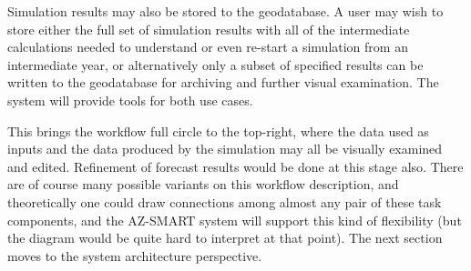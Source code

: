 Simulation results may also be stored to the geodatabase.  A user
may wish to store either the full set of simulation results with all
of the intermediate calculations needed to understand or even
re-start a simulation from an intermediate year, or alternatively
only a subset of specified results can be written to the geodatabase
for archiving and further visual examination.  The system will
provide tools for both use cases.

This brings the workflow full circle to the top-right, where the
data used as inputs and the data produced by the simulation may all
be visually examined and edited.  Refinement of forecast results
would be done at this stage also.  There are of course many possible
variants on this workflow description, and theoretically one could
draw connections among almost any pair of these task components, and
the AZ-SMART system will support this kind of flexibility (but the
diagram would be quite hard to interpret at that point).  The next
section moves to the system architecture perspective.
